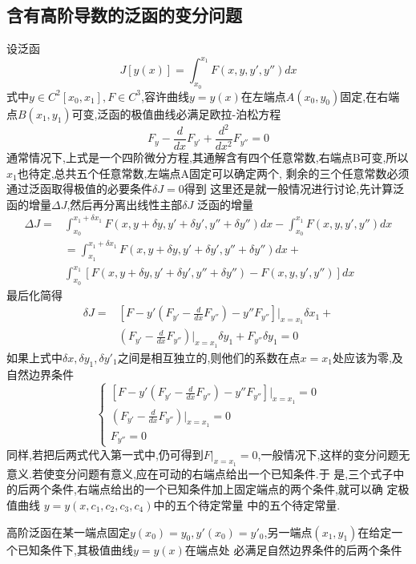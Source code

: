 \documentclass{book}
\begin{document}
\subsection{含有高阶导数的泛函的变分问题}
设泛函
\begin{equation}
 J[y(x)]=\int_{x_0}^{x_1}F(x,y,y',y'')dx
\end{equation}
式中$y \in C^2[x_0,x_1],F \in C^3$,容许曲线$y=y(x)$在左端点$A(x_0,y_0)$固定,在右端点$B(x_1,y_1)$可变,泛函的极值曲线必满足欧拉-泊松方程
$$F_y - \frac{d}{dx}F_{y'} + \frac{d^2}{dx^2}F_{y''}=0  $$
通常情况下,上式是一个四阶微分方程,其通解含有四个任意常数,右端点B可变,所以$x_1$也待定,总共五个任意常数,左端点A固定可以确定两个,
剩余的三个任意常数必须通过泛函取得极值的必要条件$\delta J=0$得到
这里还是就一般情况进行讨论,先计算泛函的增量$\Delta J$,然后再分离出线性主部$\delta J$
泛函的增量
\begin{equation}
 \begin{split}
 \Delta J = & \int_{x_0}^{x_1+\delta x_1}F(x,y+\delta y,y'+\delta y',y''+\delta y'')dx- \int_{x_0}^{x_1}F(x,y,y',y'')dx \\
              &  =\int_{x_1}^{x_1+\delta x_1}F(x,y+\delta y,y'+\delta y',y''+\delta y'')dx + \\
               & \int_{x_0}^{x_1}[F(x,y+\delta y,y'+\delta y',y''+\delta y'') -F(x,y,y',y'') ]dx
 \end{split}
\end{equation}
最后化简得
\begin{equation}
\begin{split}
 \delta J = & [F - y'(F_{y'}-\frac{d}{dx}F_{y''}) - y''F_{y''}]|_{x=x_1} \delta x_1 + \\
 & (F_{y'}-\frac{d}{dx}F_{y''})|_{x=x_1}\delta y_1 + F_{y''}\delta y_1 =0
\end{split}
\end{equation}
如果上式中$\delta x , \delta y_1, \delta y'_1$之间是相互独立的,则他们的系数在点$x=x_1$处应该为零,及自然边界条件
\begin{equation}
\left\{
  \begin{array}{ll}
[F - y'(F_{y'}-\frac{d}{dx}F_{y''}) - y''F_{y''}]|_{x=x_1}=0 \\
(F_{y'}-\frac{d}{dx}F_{y''})|_{x=x_1}=0\\
F_{y''}=0
  \end{array}
\right.
\end{equation}
同样,若把后两式代入第一式中,仍可得到$F|_{x=x_1}=0$,一般情况下,这样的变分问题无意义.若使变分问题有意义,应在可动的右端点给出一个已知条件.于
是,三个式子中的后两个条件,右端点给出的一个已知条件加上固定端点的两个条件,就可以确 定极值曲线
$y=y(x,c_1,c_2,c_3,c_4)$中的五个待定常量
中的五个待定常量.
\begin{theorem}
 高阶泛函在某一端点固定$y(x_0)=y_0,y'(x_0)=y'_0$,另一端点$(x_1,y_1)$在给定一个已知条件下,其极值曲线$y=y(x)$在端点处
必满足自然边界条件的后两个条件
\end{theorem}
\end{document}
